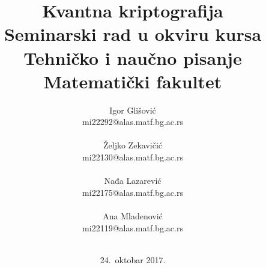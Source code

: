 \documentclass[a4paper]{article}
\begin{document}
\title{Kvantna kriptografija\\ \small{Seminarski rad u okviru kursa\\Tehničko i naučno pisanje\\ Matematički fakultet}}

\author{Igor Glišović\\mi22292@alas.matf.bg.ac.rs\\\\ Željko Zekavičić\\mi22130@alas.matf.bg.ac.rs\\\\ Nađa Lazarević\\mi22175@alas.matf.bg.ac.rs\\\\ Ana Mladenović\\mi22119@alas.matf.bg.ac.rs\\\\}
\date{24.~oktobar 2017.}
\maketitle
\end{document}
